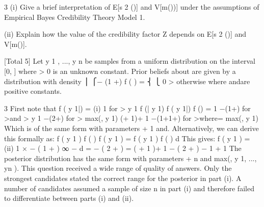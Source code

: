 

3
(i) Give a brief interpretation of E[s 2 (\theta )] and V[m(\theta ))] under the assumptions of
Empirical Bayes Credibility Theory Model 1.

(ii) Explain how the value of the credibility factor Z depends on E[s 2 (\theta )] and
V[m(\theta )].

[Total 5]
Let y 1 , ..., y n be samples from a uniform distribution on the interval [0, \theta ] where \theta  > 0
is an unknown constant. Prior beliefs about \theta  are given by a distribution with density
⎪ ⎧\alpha\beta \alpha  \theta  − (1 +\alpha  )
f ( \theta  ) = ⎨
⎩ 0
\theta >\beta 
otherwise
where \alpha  and\beta are positive constants.


3
First note that f ( y 1|\theta ) =
(i)
1
for \theta  > y 1
\theta 
f (\theta | y 1) \propto  f ( y 1|\theta ) f (\theta )
=
1
\alpha \beta \alpha  \theta −(1+\alpha ) for \theta  >\beta and \theta  > y 1
\theta 
\propto  \theta −(2+\alpha ) for \theta  > max(\beta , y 1)
\propto  (\alpha  + 1)\beta \alpha + 1 \theta −(1+1+\alpha ) for \theta  >\beta where\beta = max(\beta , y 1)
Which is of the same form with parameters \alpha  + 1 and\beta .
Alternatively, we can derive this formally as:
f ( y 1 \theta  ) f ( \theta  )
f ( \theta  y 1 ) =
\int  f ( y 1 \theta  ) f ( \theta  ) d \theta 
\theta 
This gives:
f ( \theta  y 1 ) =
(ii)
1
\theta 
× \alpha\beta \alpha  \theta  − ( 1 + \alpha  )
∞
\int \beta \alpha \beta 
\alpha 
\theta  − \alpha  d \theta 
=
\alpha\beta \alpha  \theta  − ( 2 + \alpha  )
= ( \alpha  + 1 )\beta \alpha  + 1 \theta  − ( 2 + \alpha  )
− 1
\alpha 
\alpha  + 1 \beta 
The posterior distribution has the same form with parameters \alpha  + n and
max(\beta , y 1, ..., yn ).
This question received a wide range of quality of answers. Only the strongest
candidates stated the correct range for the posterior in part (i). A number of
candidates assumed a sample of size n in part (i) and therefore failed to differentiate
between parts (i) and (ii).
